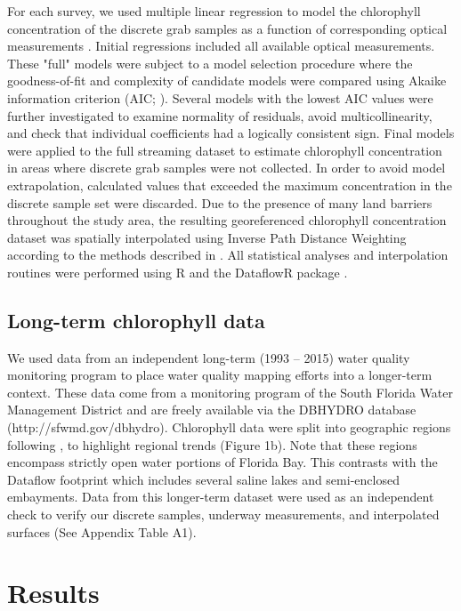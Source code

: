 For each survey, we used multiple linear regression to model the chlorophyll concentration of the discrete grab samples as a function of corresponding optical measurements \citep{seppala_ship_opportunity_2007,seppala_multivariate_2008}. Initial regressions included all available optical measurements. These "full" models were subject to a model selection procedure where the goodness-of-fit and complexity of candidate models were compared using Akaike information criterion (AIC; \citep{venables2002modern}). Several models with the lowest AIC values were further investigated to examine normality of residuals, avoid multicollinearity, and check that individual coefficients had a logically consistent sign. Final models were applied to the full streaming dataset to estimate chlorophyll concentration in areas where discrete grab samples were not collected. In order to avoid model extrapolation, calculated values that exceeded the maximum concentration in the discrete sample set were discarded. Due to the presence of many land barriers throughout the study area, the resulting georeferenced chlorophyll concentration dataset was spatially interpolated using Inverse Path Distance Weighting according to the methods described in \citep{stachelek_application_2015}. All statistical analyses and interpolation routines were performed using R \citep{rcore_2015} and the DataflowR package \citep{dataflowr}.

\subsection{Long-term chlorophyll data}
\label{longtermchl}

We used data from an independent long-term (1993 – 2015) water quality monitoring program to place water quality mapping efforts into a longer-term context. These data come from a monitoring program of the South Florida Water Management District and are freely available via the DBHYDRO database (http://sfwmd.gov/dbhydro). Chlorophyll data were split into geographic regions following \citet{boyer_seasonal_1999}, to highlight regional trends (Figure 1b). Note that these regions encompass strictly open water portions of Florida Bay. This contrasts with the Dataflow footprint which includes several saline lakes and semi-enclosed embayments. Data from this longer-term dataset were used as an independent check to verify our discrete samples, underway measurements, and interpolated surfaces (See Appendix Table A1).

\section{Results}
\label{results}

